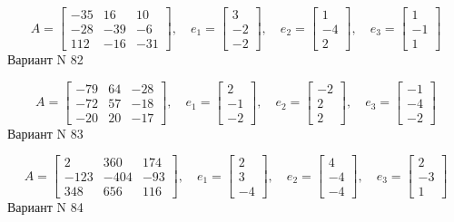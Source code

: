 \documentclass[11pt]{report}
\begin{document}
$$A = \left[\begin{matrix}-35 & 16 & 10\\-28 & -39 & -6\\112 & -16 & -31\end{matrix}\right],\quad e_1 = \left[\begin{matrix}3\\-2\\-2\end{matrix}\right],\quad e_2 = \left[\begin{matrix}1\\-4\\2\end{matrix}\right],\quad e_3 = \left[\begin{matrix}1\\-1\\1\end{matrix}\right]$$Вариант N 82

$$A = \left[\begin{matrix}-79 & 64 & -28\\-72 & 57 & -18\\-20 & 20 & -17\end{matrix}\right],\quad e_1 = \left[\begin{matrix}2\\-1\\-2\end{matrix}\right],\quad e_2 = \left[\begin{matrix}-2\\2\\2\end{matrix}\right],\quad e_3 = \left[\begin{matrix}-1\\-4\\-2\end{matrix}\right]$$Вариант N 83

$$A = \left[\begin{matrix}2 & 360 & 174\\-123 & -404 & -93\\348 & 656 & 116\end{matrix}\right],\quad e_1 = \left[\begin{matrix}2\\3\\-4\end{matrix}\right],\quad e_2 = \left[\begin{matrix}4\\-4\\-4\end{matrix}\right],\quad e_3 = \left[\begin{matrix}2\\-3\\1\end{matrix}\right]$$Вариант N 84
\end{document}
